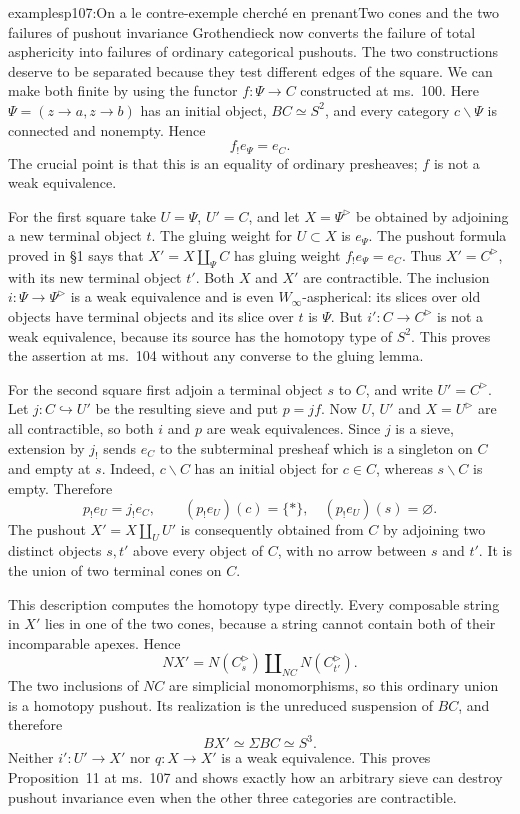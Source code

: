 \begin{dcomment}{examples}{p107:On a le contre-exemple cherché en prenant}{Two cones and the two failures of pushout invariance}
Grothendieck now converts the failure of total asphericity into failures of ordinary categorical pushouts. The two constructions deserve to be separated because they test different edges of the square. We can make both finite by using the functor $f:\Psi\to C$ constructed at ms.~100. Here $\Psi=(z\to a,z\to b)$ has an initial object, $BC\simeq S^2$, and every category $c\backslash\Psi$ is connected and nonempty. Hence
\[
 f_!e_\Psi=e_C.
\]
The crucial point is that this is an equality of ordinary presheaves; $f$ is not a weak equivalence.

For the first square take $U=\Psi$, $U'=C$, and let $X=\Psi^\triangleright$ be obtained by adjoining a new terminal object $t$. The gluing weight for $U\subset X$ is $e_\Psi$. The pushout formula proved in \S1 says that $X'=X\amalg_\Psi C$ has gluing weight $f_!e_\Psi=e_C$. Thus $X'=C^\triangleright$, with its new terminal object $t'$. Both $X$ and $X'$ are contractible. The inclusion $i:\Psi\to\Psi^\triangleright$ is a weak equivalence and is even $W_\infty$-aspherical: its slices over old objects have terminal objects and its slice over $t$ is $\Psi$. But $i':C\to C^\triangleright$ is not a weak equivalence, because its source has the homotopy type of $S^2$. This proves the assertion at ms.~104 without any converse to the gluing lemma.

For the second square first adjoin a terminal object $s$ to $C$, and write $U'=C^\triangleright$. Let $j:C\hookrightarrow U'$ be the resulting sieve and put $p=jf$. Now $U$, $U'$ and $X=U^\triangleright$ are all contractible, so both $i$ and $p$ are weak equivalences. Since $j$ is a sieve, extension by $j_!$ sends $e_C$ to the subterminal presheaf which is a singleton on $C$ and empty at $s$. Indeed, $c\backslash C$ has an initial object for $c\in C$, whereas $s\backslash C$ is empty. Therefore
\[
 p_!e_U=j_!e_C,
\qquad
 (p_!e_U)(c)=\{*\},\quad (p_!e_U)(s)=\varnothing.
\]
The pushout $X'=X\amalg_U U'$ is consequently obtained from $C$ by adjoining two distinct objects $s,t'$ above every object of $C$, with no arrow between $s$ and $t'$. It is the union of two terminal cones on $C$.

This description computes the homotopy type directly. Every composable string in $X'$ lies in one of the two cones, because a string cannot contain both of their incomparable apexes. Hence
\[
 NX'=N(C^\triangleright_s)
       \amalg_{NC}N(C^\triangleright_{t'}).
\]
The two inclusions of $NC$ are simplicial monomorphisms, so this ordinary union is a homotopy pushout. Its realization is the unreduced suspension of $BC$, and therefore
\[
 BX'\simeq\Sigma BC\simeq S^3.
\]
Neither $i':U'\to X'$ nor $q:X\to X'$ is a weak equivalence. This proves Proposition~11 at ms.~107 and shows exactly how an arbitrary sieve can destroy pushout invariance even when the other three categories are contractible.


\end{dcomment}

